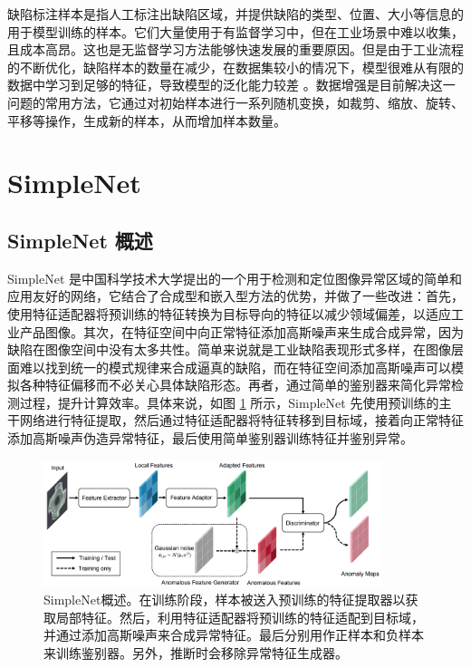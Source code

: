 \documentclass[
  ]{njuthesis}
\begin{document}
缺陷标注样本是指人工标注出缺陷区域，并提供缺陷的类型、位置、大小等信息的用于模型训练的样本。它们大量使用于有监督学习中，但在工业场景中难以收集，且成本高昂。这也是无监督学习方法能够快速发展的重要原因。但是由于工业流程的不断优化，缺陷样本的数量在减少，在数据集较小的情况下，模型很难从有限的数据中学习到足够的特征，导致模型的泛化能力较差 \cite{[8]}。数据增强是目前解决这一问题的常用方法，它通过对初始样本进行一系列随机变换，如裁剪、缩放、旋转、平移等操作，生成新的样本，从而增加样本数量。

\section{SimpleNet}

\subsection{SimpleNet 概述}

SimpleNet\cite{[9]} 是中国科学技术大学提出的一个用于检测和定位图像异常区域的简单和应用友好的网络，它结合了合成型和嵌入型方法的优势，并做了一些改进：首先，使用特征适配器将预训练的特征转换为目标导向的特征以减少领域偏差，以适应工业产品图像。其次，在特征空间中向正常特征添加高斯噪声来生成合成异常，因为缺陷在图像空间中没有太多共性。简单来说就是工业缺陷表现形式多样，在图像层面难以找到统一的模式规律来合成逼真的缺陷，而在特征空间添加高斯噪声可以模拟各种特征偏移而不必关心具体缺陷形态。再者，通过简单的鉴别器来简化异常检测过程，提升计算效率。具体来说，如图 \ref{SimpleNet} 所示，SimpleNet 先使用预训练的主干网络进行特征提取，然后通过特征适配器将特征转移到目标域，接着向正常特征添加高斯噪声伪造异常特征，最后使用简单鉴别器训练特征并鉴别异常。

\begin{figure}[ht]
    \centering
    \includegraphics[width=0.88\textwidth]{images/SimpleNet概述.png}
    \caption{SimpleNet概述。在训练阶段，样本被送入预训练的特征提取器以获取局部特征。然后，利用特征适配器将预训练的特征适配到目标域，并通过添加高斯噪声来合成异常特征。最后分别用作正样本和负样本来训练鉴别器。另外，推断时会移除异常特征生成器。}
    \label{SimpleNet}
\end{figure}
\end{document}
